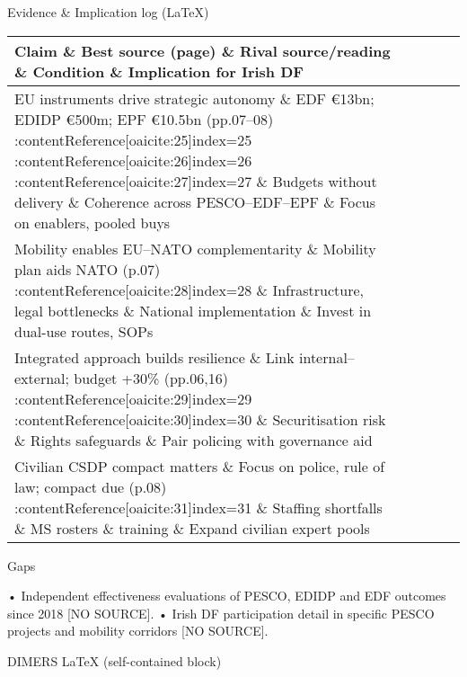 Evidence \& Implication log (LaTeX)
\begin{tabular}{p{3.2cm}p{4.2cm}p{3.6cm}p{3.2cm}p{4.2cm}}
	\textbf{Claim} \& \textbf{Best source (page)} \& \textbf{Rival source/reading} \& \textbf{Condition} \& \textbf{Implication for Irish DF}\\\hline
	EU instruments drive strategic autonomy \& EDF €13bn; EDIDP €500m; EPF €10.5bn (pp.07–08) :contentReference[oaicite:25]{index=25} :contentReference[oaicite:26]{index=26} :contentReference[oaicite:27]{index=27} \& Budgets without delivery \& Coherence across PESCO–EDF–EPF \& Focus on enablers, pooled buys\\
	Mobility enables EU–NATO complementarity \& Mobility plan aids NATO (p.07) :contentReference[oaicite:28]{index=28} \& Infrastructure, legal bottlenecks \& National implementation \& Invest in dual-use routes, SOPs\\
	Integrated approach builds resilience \& Link internal–external; budget +30\% (pp.06,16) :contentReference[oaicite:29]{index=29} :contentReference[oaicite:30]{index=30} \& Securitisation risk \& Rights safeguards \& Pair policing with governance aid\\
	Civilian CSDP compact matters \& Focus on police, rule of law; compact due (p.08) :contentReference[oaicite:31]{index=31} \& Staffing shortfalls \& MS rosters \& training \& Expand civilian expert pools\\
\end{tabular}

Gaps

• Independent effectiveness evaluations of PESCO, EDIDP and EDF outcomes since 2018 [NO SOURCE].
• Irish DF participation detail in specific PESCO projects and mobility corridors [NO SOURCE].

\parencite{FLEMING_2015}

DIMERS LaTeX (self-contained block)

